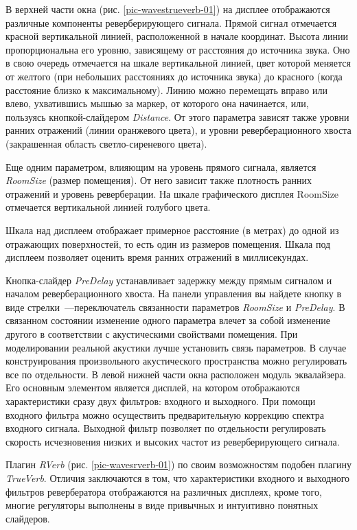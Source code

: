 \documentclass[oneside, final, 14pt]{extreport}
\begin{document}
В верхней части окна (рис. \ref{pic-wavestrueverb-01}) на дисплее отображаются различные компоненты реверберирующего сигнала. Прямой сигнал отмечается красной вертикальной линией, расположенной в начале координат. Высота линии пропорциональна его уровню, зависящему от расстояния до источника звука. Оно в свою очередь отмечается на шкале вертикальной линией, цвет которой меняется от желтого (при небольших расстояниях до источника звука) до красного (когда расстояние близко к максимальному). Линию можно перемещать вправо или влево, ухватившись мышью за маркер, от которого она начинается, или, пользуясь кнопкой-слайдером \emph{Distance}. От этого параметра зависят также уровни ранних отражений (линии оранжевого цвета), и уровни реверберационного хвоста (закрашенная область светло-сиреневого цвета).

Еще одним параметром, влияющим на уровень прямого сигнала, является \emph{RoomSize} (размер помещения). От него зависит также плотность ранних отражений и уровень реверберации. На шкале графического дисплея RoomSize отмечается вертикальной линией голубого цвета.

Шкала над дисплеем отображает примерное расстояние (в метрах) до одной из отражающих поверхностей, то есть один из размеров помещения. Шкала под дисплеем позволяет оценить время ранних отражений в миллисекундах.

Кнопка-слайдер \emph{PreDelay} устанавливает задержку между прямым сигналом и началом реверберационного хвоста. На панели управления вы найдете кнопку в виде стрелки~---переключатель связанности параметров \emph{RoomSize} и \emph{PreDelay}. В связанном состоянии изменение одного параметра влечет за собой изменение другого в соответствии с акустическими свойствами помещения. При моделировании реальной акустики лучше установить связь параметров. В случае конструирования произвольного акустического пространства можно регулировать все по отдельности.
В левой нижней части окна расположен модуль эквалайзера. Его основным элементом является дисплей, на котором отображаются характеристики сразу двух фильтров: входного и выходного. При помощи входного фильтра можно осуществить предварительную коррекцию спектра входного сигнала. Выходной фильтр позволяет по отдельности регулировать скорость исчезновения низких и высоких частот из реверберирующего сигнала.

Плагин \emph{RVerb} (рис. \ref{pic-wavesrverb-01}) по своим возможностям подобен плагину \emph{TrueVerb}. Отличия заключаются в том, что характеристики входного и выходного фильтров ревербератора отображаются на различных дисплеях, кроме того, многие регуляторы выполнены в виде привычных и интуитивно понятных слайдеров.
\end{document}
